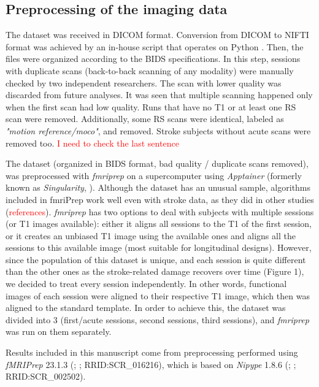 \documentclass[fleqn,10pt]{wlscirep}
\begin{document}
\subsection*{Preprocessing of the imaging data}
The dataset was received in DICOM format. Conversion from DICOM to NIFTI format was achieved by an in-house script that operates on Python \citep{rogetgithub}. Then, the files were organized according to the BIDS specifications. In this step, sessions with duplicate scans (back-to-back scanning of any modality) were manually checked by two independent researchers. The scan with lower quality was discarded from future analyses. It was seen that multiple scanning happened only when the first scan had low quality. Runs that have no T1 or at least one RS scan were removed.  Additionally, some RS scans were identical, labeled as \textit{"motion reference/moco"}, and removed. Stroke subjects without acute scans were removed too. \textcolor{red}{I need to check the last sentence}

The dataset (organized in BIDS format, bad quality / duplicate scans removed), was preprocessed with \emph{fmriprep} \citep{fmriprep1} on a supercomputer using \emph{Apptainer} (formerly known as \emph{Singularity}, \cite{kurtzer2017singularity}). Although the dataset has an unusual sample, algorithms included in fmriPrep work well even with stroke data, as they did in other studies  (\textcolor{red}{references}). \emph{fmriprep} has two options to deal with subjects with multiple sessions (or T1 images available): either it aligns all sessions to the T1 of the first session, or it creates an unbiased T1 image using the available ones and aligns all the sessions to this available image (most suitable for longitudinal designs). However, since the population of this dataset is unique, and each session is quite different than the other ones as the stroke-related damage recovers over time (Figure 1), we decided to treat every session independently. In other words, functional images of each session were aligned to their respective T1 image, which then was aligned to the standard template. In order to achieve this, the dataset was divided into 3 (first/acute sessions, second sessions, third sessions), and \emph{fmriprep} \citep{fmriprep1} was run on them separately. 

Results included in this manuscript come from preprocessing performed
using \emph{fMRIPrep} 23.1.3 (\citet{fmriprep1}; \citet{fmriprep2};
RRID:SCR\_016216), which is based on \emph{Nipype} 1.8.6
(\citet{nipype1}; \citet{nipype2}; RRID:SCR\_002502).
\end{document}
